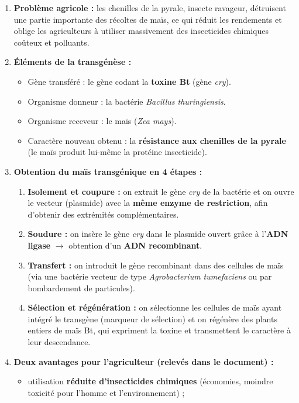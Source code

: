 \documentclass[11pt]{article}
\begin{document}
\begin{corrige}
\begin{enumerate}
\item \textbf{Problème agricole :} les chenilles de la pyrale, insecte ravageur, détruisent une partie importante des récoltes de maïs, ce qui réduit les rendements et oblige les agriculteurs à utiliser massivement des insecticides chimiques coûteux et polluants.
\item \textbf{Éléments de la transgénèse :}
\begin{itemize}
\item Gène transféré : le gène codant la \textbf{toxine Bt} (gène \emph{cry}).
\item Organisme donneur : la bactérie \emph{Bacillus thuringiensis}.
\item Organisme receveur : le maïs (\emph{Zea mays}).
\item Caractère nouveau obtenu : la \textbf{résistance aux chenilles de la pyrale} (le maïs produit lui-même la protéine insecticide).
\end{itemize}
\item \textbf{Obtention du maïs transgénique en 4 étapes :}
\begin{enumerate}
\item \textbf{Isolement et coupure :} on extrait le gène \emph{cry} de la bactérie et on ouvre le vecteur (plasmide) avec la \textbf{même enzyme de restriction}, afin d'obtenir des extrémités complémentaires.
\item \textbf{Soudure :} on insère le gène \emph{cry} dans le plasmide ouvert grâce à l'\textbf{ADN ligase} $\rightarrow$ obtention d'un \textbf{ADN recombinant}.
\item \textbf{Transfert :} on introduit le gène recombinant dans des cellules de maïs (via une bactérie vecteur de type \emph{Agrobacterium tumefaciens} ou par bombardement de particules).
\item \textbf{Sélection et régénération :} on sélectionne les cellules de maïs ayant intégré le transgène (marqueur de sélection) et on régénère des plants entiers de maïs Bt, qui expriment la toxine et transmettent le caractère à leur descendance.
\end{enumerate}
\item \textbf{Deux avantages pour l'agriculteur (relevés dans le document) :}
\begin{itemize}
\item utilisation \textbf{réduite d'insecticides chimiques} (économies, moindre toxicité pour l'homme et l'environnement) ;

\end{itemize}
\end{enumerate}
\end{corrige}
\end{document}

